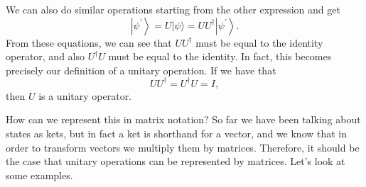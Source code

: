 We can also do similar operations starting from the other expression and get
\begin{equation}
\left|\psi^{\prime}\right\rangle=U|\psi\rangle=U U^{\dagger}\left|\psi^{\prime}\right\rangle.
\end{equation}
From these equations,  we can see that $UU^\dagger$ must be equal to the identity operator, and also $U^\dagger U$ must be equal to the identity.
In fact, this becomes precisely our definition of a unitary operation.
If we have that 
\begin{equation}
U U^{\dagger}=U^{\dagger} U=I,
\end{equation}
then $U$ is a unitary operator.

How can we represent this in matrix notation? So far we have been talking about states as kets, but in fact a ket is shorthand for a vector, and we know that in order to transform vectors we multiply them by matrices. Therefore, it should be the case that unitary operations can be represented by matrices. Let's look at some examples. 

